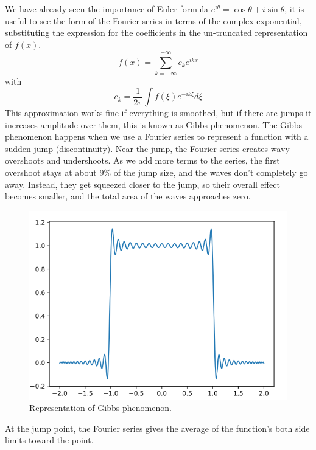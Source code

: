 We have already seen the importance of Euler formula $e^{i\theta}=\cos\theta+i\sin\theta$, it is useful to see the form of the Fourier series in terms of the complex exponential, substituting the expression for the coefficients in the un-truncated representation of $f(x)$.
\begin{equation}\label{eq.complex Fourier}
    f(x)=\displaystyle\sum_{k=-\infty}^{+\infty}c_ke^{ikx}
\end{equation}
with 
\begin{equation}
    c_k=\frac{1}{2\pi}\int f(\xi)e^{-ik\xi}d\xi
\end{equation}
This approximation works fine if everything is smoothed, but if there are jumps it increases amplitude over them, this is known as Gibbs phenomenon. 
The Gibbs phenomenon happens when we use a Fourier series to represent a function with a sudden jump (discontinuity). Near the jump, the Fourier series creates wavy overshoots and undershoots. As we add more terms to the series, the first overshoot stays at about 9\% of the jump size, and the waves don’t completely go away. Instead, they get squeezed closer to the jump, so their overall effect becomes smaller, and the total area of the waves approaches zero.
\begin{figure}
    \centering
    \includegraphics[width=0.5\linewidth]{uploads/Screenshot 2024-11-14 170405.png}
    \caption{Representation of Gibbs phenomenon.}
    \label{fig:Gibbs}
\end{figure}
At the jump point, the Fourier series gives the average of the function's both side limits toward the point. 

